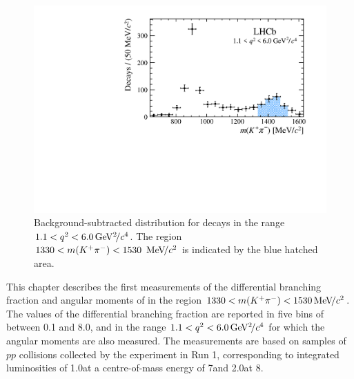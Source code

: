 \begin{figure}[!tb]
 \centering
 \includegraphics[width=0.7\linewidth]{figs/kpimm/introduction/full-mkpi.pdf}
 \caption{Background-subtracted \mkpi distribution for \BdToKpimm decays in the range $1.1<{q^2}<6.0{\mathrm{\,Ge\kern -0.1em V^2\!/}c^4}$. The region $1330<m({{K}^+}{{\pi}^-})<1530~{\mathrm{\,Me\kern -0.1em V\!/}c^2}$ is indicated by the blue hatched area.}
\label{fig:full-mkpi}
\end{figure}

This chapter describes the first measurements of the differential branching fraction and angular moments of \BdToKpimm in the region $1330<m({{K}^+}{{\pi}^-})<1530{\mathrm{\,Me\kern -0.1em V\!/}c^2}$. The values of the differential branching fraction are reported in five bins of \qsq between 0.1 and 8.0\gevgevcccc, and in the range $1.1<{q^2}<6.0{\mathrm{\,Ge\kern -0.1em V^2\!/}c^4}$ for which the angular moments are also measured. The measurements are based on samples of $pp$ collisions collected by the \lhcb experiment in Run 1, corresponding to integrated luminosities of 1.0\invfb at a centre-of-mass energy of 7\tev and 2.0\invfb at 8\tev.  
